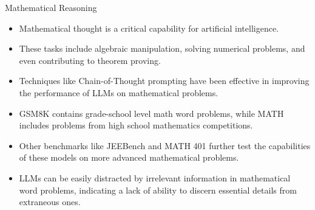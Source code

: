 \begin{frame}{Mathematical Reasoning}
	\begin{itemize}
    \item Mathematical thought is a critical capability for artificial intelligence.
\item These tasks include algebraic manipulation, solving numerical problems, and even contributing to theorem proving.
	\item Techniques like Chain-of-Thought prompting have been effective in improving the performance of LLMs on mathematical problems.
	\item GSM8K contains grade-school level math word problems, while MATH includes problems from high school mathematics competitions.
	\item Other benchmarks like JEEBench and MATH 401 further test the capabilities of these models on more advanced mathematical problems.
	\item LLMs can be easily distracted by irrelevant information in mathematical word problems, indicating a lack of ability to discern essential details from extraneous ones.
    \end{itemize}


\end{frame}

